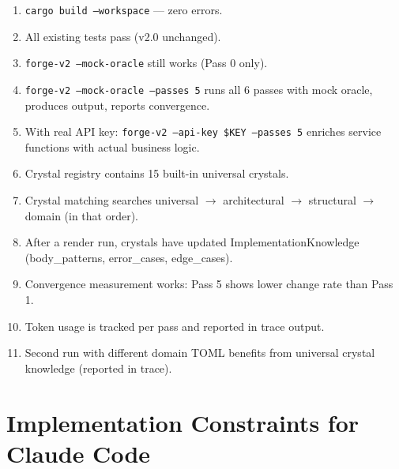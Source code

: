 \documentclass[11pt,a4paper]{article}
\begin{document}
\begin{enumerate}
\item \texttt{cargo build --workspace} --- zero errors.
\item All existing tests pass (v2.0 unchanged).
\item \texttt{forge-v2 --mock-oracle} still works (Pass 0 only).
\item \texttt{forge-v2 --mock-oracle --passes 5} runs all 6 passes
  with mock oracle, produces output, reports convergence.
\item With real API key: \texttt{forge-v2 --api-key \$KEY --passes 5}
  enriches service functions with actual business logic.
\item Crystal registry contains 15 built-in universal crystals.
\item Crystal matching searches universal $\to$ architectural $\to$
  structural $\to$ domain (in that order).
\item After a render run, crystals have updated ImplementationKnowledge
  (body\_patterns, error\_cases, edge\_cases).
\item Convergence measurement works: Pass 5 shows lower change rate
  than Pass 1.
\item Token usage is tracked per pass and reported in trace output.
\item Second run with different domain TOML benefits from universal
  crystal knowledge (reported in trace).
\end{enumerate}

\section{Implementation Constraints for Claude Code}
\end{document}
